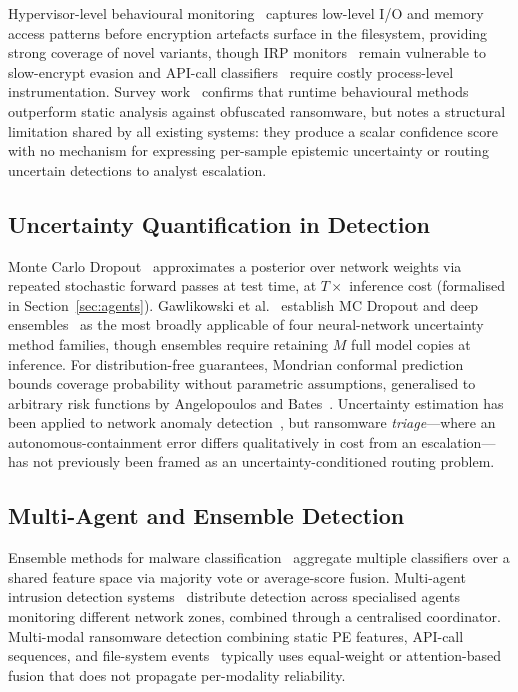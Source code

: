 \documentclass[journal]{IEEEtran}
\begin{document}
Hypervisor-level behavioural monitoring~\cite{hirano2025ransmap}
captures low-level I/O and memory access patterns before encryption
artefacts surface in the filesystem, providing strong coverage of novel
variants, though IRP monitors~\cite{scaife_cryptolock_2016} remain
vulnerable to slow-encrypt evasion and API-call
classifiers~\cite{sgandurra_automated_2016} require
costly process-level instrumentation.
Survey work~\cite{moussaileb2021survey} confirms that
runtime behavioural methods outperform static analysis against obfuscated
ransomware, but notes a structural limitation shared by all existing
systems: they produce a scalar confidence score with no mechanism for
expressing per-sample epistemic uncertainty or routing uncertain
detections to analyst escalation.

\subsection{Uncertainty Quantification in Detection}

Monte Carlo Dropout~\cite{gal2016dropout} approximates a posterior over
network weights via repeated stochastic forward passes at test time, at
$T\times$ inference cost (formalised in Section~\ref{sec:agents}).
Gawlikowski et al.~\cite{gawlikowski2023Uncertainity} establish MC Dropout
and deep ensembles~\cite{lakshminarayanan_simple_2017} as the most broadly
applicable of four neural-network uncertainty method families, though
ensembles require retaining $M$ full model copies at inference.
For distribution-free guarantees, Mondrian conformal
prediction~\cite{vovk_mondrian_2003} bounds coverage probability
without parametric assumptions, generalised to arbitrary risk functions
by Angelopoulos and Bates~\cite{angelopoulos_conformal_risk_2022}.
Uncertainty estimation has been applied to network anomaly
detection~\cite{Doan2024uncertainBay}, but ransomware \emph{triage}---where
an autonomous-containment error differs qualitatively in cost from an
escalation---has not previously been framed as an uncertainty-conditioned
routing problem.

\subsection{Multi-Agent and Ensemble Detection}

Ensemble methods for malware classification~\cite{sagi_ensemble_2018,
masum2022ransomware} aggregate multiple classifiers over a shared feature
space via majority vote or average-score fusion.
Multi-agent intrusion detection systems~\cite{MultiAgentAdaptiveDetection2023}
distribute detection across specialised agents monitoring different network
zones, combined through a centralised coordinator.
Multi-modal ransomware detection combining static PE features, API-call
sequences, and file-system events~\cite{moussaileb2021survey} typically
uses equal-weight or attention-based fusion that does not propagate
per-modality reliability.
\end{document}
